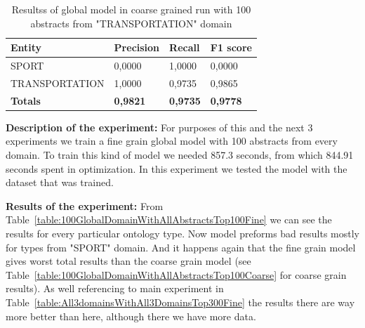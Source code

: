 \documentclass[thesis=M,english]{FITthesis}[2018/05/30]
\begin{document}
	\begin{table}[H]\centering
		\begin{tabular}{|l|l|l|l|}
			\hline {\textbf{Entity}} & {\textbf{Precision}} & {\textbf{Recall}} & {\textbf{F1 score}}\\\hline
				SPORT & 0,0000 & 1,0000 & 0,0000\\
				TRANSPORTATION & 1,0000 & 0,9735 & 0,9865\\\hline
				\textbf{Totals} & \textbf{0,9821} & \textbf{0,9735} & \textbf{0,9778}\\\hline
		\end{tabular}
		\caption{Resultss of global model in coarse grained run with 100 abstracts from "TRANSPORTATION" domain \label{table:100GlobalDomainWithTransportationTop100Coarse}}
	\end{table}	
		


	\textbf{Description of the experiment:} For purposes of this and the next 3 experiments we train a fine grain global model with 100 abstracts from every domain. To train this kind of model we needed 857.3 seconds, from which 844.91 seconds spent in optimization. In this experiment we tested the model with the dataset that was trained. 

	\textbf{Results of the experiment:} From Table~\ref{table:100GlobalDomainWithAllAbstractsTop100Fine} we can see the results for every particular ontology type. Now model preforms bad results mostly for types from "SPORT" domain. And it happens again that the fine grain model gives worst total results than the coarse grain model (see Table~\ref{table:100GlobalDomainWithAllAbstractsTop100Coarse} for coarse grain results). As well referencing to main experiment in Table~\ref{table:All3domainsWithAll3DomainsTop300Fine} the results there are way more better than here, although there we have more data.
\end{document}
